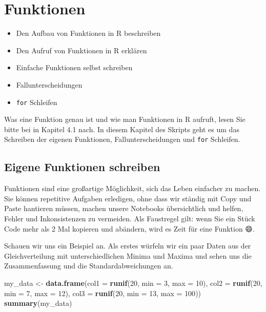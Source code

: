 \documentclass[]{book}
\newenvironment{Shaded}{\begin{snugshade}}{\end{snugshade}}
\newcommand{\DataTypeTok}[1]{\textcolor[rgb]{0.13,0.29,0.53}{#1}}
\newcommand{\DecValTok}[1]{\textcolor[rgb]{0.00,0.00,0.81}{#1}}
\newcommand{\KeywordTok}[1]{\textcolor[rgb]{0.13,0.29,0.53}{\textbf{#1}}}
\newcommand{\NormalTok}[1]{#1}
\newcommand{\StringTok}[1]{\textcolor[rgb]{0.31,0.60,0.02}{#1}}
\providecommand{\tightlist}{%
  \setlength{\itemsep}{0pt}\setlength{\parskip}{0pt}}
\newenvironment{rmdoutcomes}{
  \definecolor{outcomes}{rgb}{1.0, 0.92, 0.8}  %
  \color{black}
  \begin{mdframed}[backgroundcolor = outcomes]}
 {\end{mdframed}}
\begin{document}
\hypertarget{funktionen}{%
\chapter{Funktionen}\label{funktionen}}

\begin{rmdoutcomes}
\begin{itemize}
\tightlist
\item
  Den Aufbau von Funktionen in R beschreiben
\item
  Den Aufruf von Funktionen in R erklären
\item
  Einfache Funktionen selbst schreiben
\item
  Fallunterscheidungen
\item
  \texttt{for} Schleifen
\end{itemize}
\end{rmdoutcomes}

Was eine Funktion genau ist und wie man Funktionen in R aufruft, lesen Sie bitte bei \citet{Ligges2008} in Kapitel 4.1 nach. In diesem Kapitel des Skripts geht es um das Schreiben der eigenen Funktionen, Fallunterscheidungen und \texttt{for} Schleifen.

\hypertarget{eigene-funktionen-schreiben}{%
\section{Eigene Funktionen schreiben}\label{eigene-funktionen-schreiben}}

Funktionen sind eine großartige Möglichkeit, sich das Leben einfacher zu machen. Sie können repetitive Aufgaben erledigen, ohne dass wir ständig mit Copy und Paste hantieren müssen, machen unsere Notebooks übersichtlich und helfen, Fehler und Inkonsistenzen zu vermeiden. Als Faustregel gilt: wenn Sie ein Stück Code mehr als 2 Mal kopieren und abändern, wird es Zeit für eine Funktion 😄.

Schauen wir uns ein Beispiel an. Als erstes würfeln wir ein paar Daten aus der Gleichverteilung mit unterschiedlichen Minima und Maxima und sehen uns die Zusammenfassung und die Standardabweichungen an.

\begin{Shaded}
\begin{Highlighting}[]
\NormalTok{my_data <-}\StringTok{ }\KeywordTok{data.frame}\NormalTok{(}\DataTypeTok{col1 =} \KeywordTok{runif}\NormalTok{(}\DecValTok{20}\NormalTok{, }\DataTypeTok{min =} \DecValTok{3}\NormalTok{, }\DataTypeTok{max =} \DecValTok{10}\NormalTok{),}
                      \DataTypeTok{col2 =} \KeywordTok{runif}\NormalTok{(}\DecValTok{20}\NormalTok{, }\DataTypeTok{min =} \DecValTok{7}\NormalTok{, }\DataTypeTok{max =} \DecValTok{12}\NormalTok{),}
                      \DataTypeTok{col3 =} \KeywordTok{runif}\NormalTok{(}\DecValTok{20}\NormalTok{, }\DataTypeTok{min =} \DecValTok{13}\NormalTok{, }\DataTypeTok{max =} \DecValTok{100}\NormalTok{))}
\KeywordTok{summary}\NormalTok{(my_data)}
\end{Highlighting}
\end{Shaded}
\end{document}
